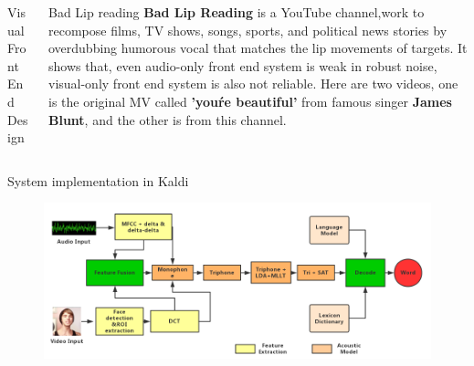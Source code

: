 \documentclass[final]{beamer}
\newlength{\onecolwid}
\newlength{\twocolwid}
\begin{document}
\begin{frame}[t]
\begin{columns}[t]
\begin{column}{\twocolwid}
\begin{columns}[t,totalwidth=\twocolwid]
\begin{column}{\onecolwid}
\begin{block}{Visual Front End Design}
\begin{enumerate}
\end{enumerate}
\end{block}

\end{column} %

\begin{column}{\onecolwid}\vspace{-.6in} %


\begin{block}{Bad Lip reading}
\textbf{Bad Lip Reading}\cite{BLR} is a YouTube channel,work to recompose films, TV shows, songs, sports, and political news stories by overdubbing humorous vocal that matches the lip movements of targets. It shows that, even audio-only front end system is weak in robust noise, visual-only front end system is also not reliable. Here are two videos, one is the original MV called \textbf{'you\'re beautiful'} from famous singer \textbf{James Blunt}, and the other is from this channel.
 

\end{block}


\end{column} %

\end{columns} %

%	

\begin{alertblock}{System implementation in Kaldi}
\begin{figure}
\includegraphics[width=1\linewidth]{dia.jpg}
\end{figure}
\end{alertblock} 




\end{column}
\end{columns}
\end{frame}
\end{document}
